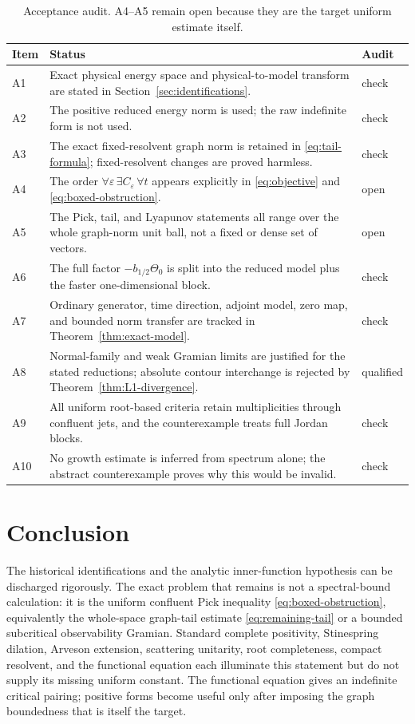 \documentclass[11pt]{amsart}
\theoremstyle{definition}
\theoremstyle{remark}
\newcommand{\eps}{\varepsilon}
\begin{document}
\begin{table}[H]
\centering
\small
\begin{tabular}{p{}p{}p{}}
\hline
Item & Status & Audit\\
\hline
A1 & Exact physical energy space and physical-to-model transform are stated
     in Section~\ref{sec:identifications}. & check\\
A2 & The positive reduced energy norm is used; the raw indefinite form is
     not used. & check\\
A3 & The exact fixed-resolvent graph norm is retained in
     \eqref{eq:tail-formula}; fixed-resolvent changes are proved harmless. & check\\
A4 & The order $\forall\eps\,\exists C_\eps\,\forall t$ appears explicitly
     in \eqref{eq:objective} and \eqref{eq:boxed-obstruction}. & open\\
A5 & The Pick, tail, and Lyapunov statements all range over the whole
     graph-norm unit ball, not a fixed or dense set of vectors. & open\\
A6 & The full factor $-b_{1/2}\Theta_0$ is split into the reduced model plus
     the faster one-dimensional block. & check\\
A7 & Ordinary generator, time direction, adjoint model, zero map, and bounded
     norm transfer are tracked in Theorem~\ref{thm:exact-model}. & check\\
A8 & Normal-family and weak Gramian limits are justified for the stated
     reductions; absolute contour interchange is rejected by
     Theorem~\ref{thm:L1-divergence}. & qualified\\
A9 & All uniform root-based criteria retain multiplicities through confluent
     jets, and the counterexample treats full Jordan blocks. & check\\
A10 & No growth estimate is inferred from spectrum alone; the abstract
      counterexample proves why this would be invalid. & check\\
\hline
\end{tabular}
\caption{Acceptance audit.  A4--A5 remain open because they are the target
uniform estimate itself.}
\label{tab:acceptance}
\end{table}

\section{Conclusion}

The historical identifications and the analytic inner-function hypothesis
can be discharged rigorously.  The exact problem that remains is not a
spectral-bound calculation: it is the uniform confluent Pick inequality
\eqref{eq:boxed-obstruction}, equivalently the whole-space graph-tail estimate
\eqref{eq:remaining-tail} or a bounded subcritical observability Gramian.
Standard complete positivity, Stinespring dilation, Arveson extension,
scattering unitarity, root completeness, compact resolvent, and the functional
equation each illuminate this statement but do not supply its missing uniform
constant.  The functional equation gives an indefinite critical pairing;
positive forms become useful only after imposing the graph boundedness that
is itself the target.
\end{document}
